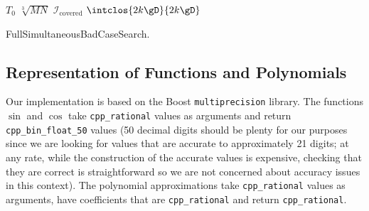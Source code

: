 \documentclass[10pt, a4paper, twoside]{basestyle}
\begin{document}
\begin{algorithm}
\DontPrintSemicolon
\SetAlgoLined
\LinesNumbered
{}
$T_0$ \leftarrow $\sqrt[3]{M N}$\;
$\mathscr{I}_{\text{covered}}$ \leftarrow $\intclos{2 k \gD}{2 k \gD}$\;
\caption{FullSimultaneousBadCaseSearch\label{FSBCS}.}
\end{algorithm}

\subsection*{Representation of Functions and Polynomials}

Our implementation is based on the Boost \texttt{multiprecision} library.  The functions $\sin$ and $\cos$ take \texttt{cpp\_rational} values as arguments and return \texttt{cpp\_bin\_float\_50} values (50 decimal digits should be plenty for our purposes since we are looking for values that are accurate to approximately 21 digits; at any rate, while the construction of the accurate values is expensive, checking that they are correct is straightforward so we are not concerned about accuracy issues in this context).  The polynomial approximations take \texttt{cpp\_rational} values as arguments, have coefficients that are \texttt{cpp\_rational} and return \texttt{cpp\_rational}.
\end{document}

